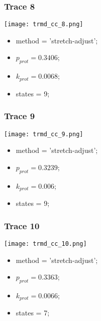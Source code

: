 \subsubsection{Trace 8}
\begin{minipage}[c]{0.7\textwidth}
	\texttt{[image: trmd\_cc\_8.png]}
\end{minipage}
\hfill
\begin{minipage}[c]{0.45\textwidth}
	\begin{itemize}
		\item method = 'stretch-adjust';
		\item $p_{prot}=0.3406$;
		\item $k_{prot}=0.0068$;
		\item states = 9;
	\end{itemize}
\end{minipage}

\subsubsection{Trace 9}
\begin{minipage}[c]{0.7\textwidth}
	\texttt{[image: trmd\_cc\_9.png]}
\end{minipage}
\hfill
\begin{minipage}[c]{0.45\textwidth}
	\begin{itemize}
		\item method = 'stretch-adjust';
		\item $p_{prot}=0.3239$;
		\item $k_{prot}=0.006$;
		\item states = 9;
	\end{itemize}
\end{minipage}

\subsubsection{Trace 10}
\begin{minipage}[c]{0.7\textwidth}
	\texttt{[image: trmd\_cc\_10.png]}
\end{minipage}
\hfill
\begin{minipage}[c]{0.45\textwidth}
	\begin{itemize}
		\item method = 'stretch-adjust';
		\item $p_{prot}=0.3363$;
		\item $k_{prot}=0.0066$;
		\item states = 7;
	\end{itemize}
\end{minipage}

